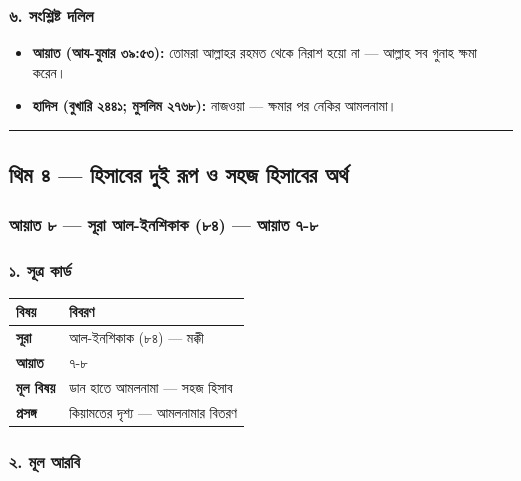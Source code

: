 \subsubsection*{৬. সংশ্লিষ্ট দলিল}

\begin{itemize}
\item \textbf{আয়াত (আয-যুমার ৩৯:৫৩):} তোমরা আল্লাহর রহমত থেকে নিরাশ হয়ো না — আল্লাহ সব গুনাহ ক্ষমা করেন।
\item \textbf{হাদিস (বুখারি ২৪৪১; মুসলিম ২৭৬৮):} নাজওয়া — ক্ষমার পর নেকির আমলনামা।
\end{itemize}
\medskip\hrule\medskip

\subsection*{থিম ৪ — হিসাবের দুই রূপ ও সহজ হিসাবের অর্থ}

\subsubsection*{আয়াত ৮ — সূরা আল-ইনশিকাক (৮৪) — আয়াত ৭-৮}

\subsubsection*{১. সূত্র কার্ড}

\begin{table}[h]\centering\small
\begin{tabular}{ll}
বিষয় & বিবরণ \\
\hline
\textbf{সূরা} & আল-ইনশিকাক (৮৪) — মক্কী \\
\textbf{আয়াত} & ৭-৮ \\
\textbf{মূল বিষয়} & ডান হাতে আমলনামা — সহজ হিসাব \\
\textbf{প্রসঙ্গ} & কিয়ামতের দৃশ্য — আমলনামার বিতরণ \\
\hline
\end{tabular}
\end{table}

\subsubsection*{২. মূল আরবি}

\begin{center}\end{center}

